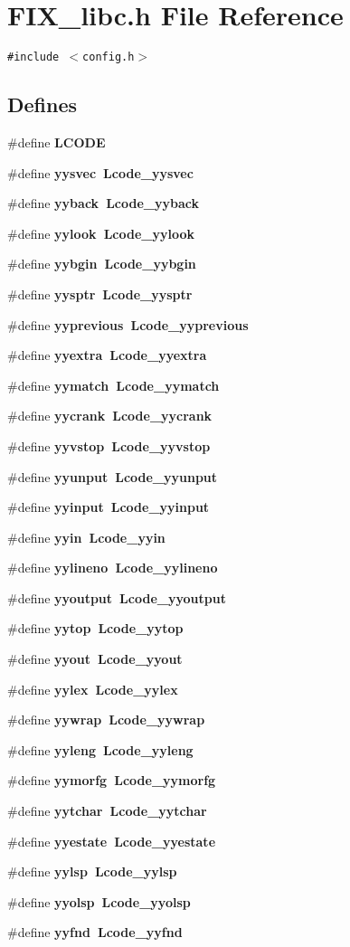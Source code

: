 \section{FIX\_\-libc.h File Reference}
\label{FIX__libc_8h}
{\tt \#include $<$config.h$>$}\par
\subsection*{Defines}
\begin{CompactItemize}
\item 
\#define \bf{LCODE}
\item 
\#define \bf{yysvec}~Lcode\_\-yysvec
\item 
\#define \bf{yyback}~Lcode\_\-yyback
\item 
\#define \bf{yylook}~Lcode\_\-yylook
\item 
\#define \bf{yybgin}~Lcode\_\-yybgin
\item 
\#define \bf{yysptr}~Lcode\_\-yysptr
\item 
\#define \bf{yyprevious}~Lcode\_\-yyprevious
\item 
\#define \bf{yyextra}~Lcode\_\-yyextra
\item 
\#define \bf{yymatch}~Lcode\_\-yymatch
\item 
\#define \bf{yycrank}~Lcode\_\-yycrank
\item 
\#define \bf{yyvstop}~Lcode\_\-yyvstop
\item 
\#define \bf{yyunput}~Lcode\_\-yyunput
\item 
\#define \bf{yyinput}~Lcode\_\-yyinput
\item 
\#define \bf{yyin}~Lcode\_\-yyin
\item 
\#define \bf{yylineno}~Lcode\_\-yylineno
\item 
\#define \bf{yyoutput}~Lcode\_\-yyoutput
\item 
\#define \bf{yytop}~Lcode\_\-yytop
\item 
\#define \bf{yyout}~Lcode\_\-yyout
\item 
\#define \bf{yylex}~Lcode\_\-yylex
\item 
\#define \bf{yywrap}~Lcode\_\-yywrap
\item 
\#define \bf{yyleng}~Lcode\_\-yyleng
\item 
\#define \bf{yymorfg}~Lcode\_\-yymorfg
\item 
\#define \bf{yytchar}~Lcode\_\-yytchar
\item 
\#define \bf{yyestate}~Lcode\_\-yyestate
\item 
\#define \bf{yylsp}~Lcode\_\-yylsp
\item 
\#define \bf{yyolsp}~Lcode\_\-yyolsp
\item 
\#define \bf{yyfnd}~Lcode\_\-yyfnd
\end{CompactItemize}


